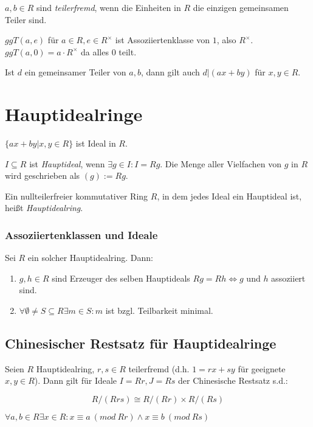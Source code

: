$a, b \in R$ sind \emph{teilerfremd}, wenn die Einheiten in $R$ die einzigen gemeinsamen Teiler sind.

\spacing

$ggT(a,e)$ für $a \in R, e \in R^\times$ ist Assoziiertenklasse von $1$, also $R^\times$. $ggT(a,0) = a\cdot R^\times$ da alles $0$ teilt.

Ist $d$ ein gemeinsamer Teiler von $a, b$, dann gilt auch $d |(ax+by)$ für $x,y \in R$.

\section*{Hauptidealringe}

$\{ax+by | x,y \in R\}$ ist Ideal in $R$.

$I \subseteq R$ ist \emph{Hauptideal}, wenn $\exists g \in I : I = Rg$. Die Menge aller Vielfachen von $g$ in $R$ wird geschrieben als $(g) := Rg$.

\spacing

Ein nullteilerfreier kommutativer Ring $R$, in dem jedes Ideal ein Hauptideal ist, heißt \emph{Hauptidealring}.

\subsubsection*{Assoziiertenklassen und Ideale}

Sei $R$ ein solcher Hauptidealring. Dann:

\begin{enumerate}[label=(\alph*)]
	\item $g, h \in R$ sind Erzeuger des selben Hauptideals $Rg = Rh \iff g$ und $h$ assoziiert sind.
	\item $\forall \emptyset \neq S \subseteq R \exists m \in S : m$ ist bzgl. Teilbarkeit minimal.
\end{enumerate}

\subsection*{Chinesischer Restsatz für Hauptidealringe}

Seien $R$ Hauptidealring, $r, s \in R$ teilerfremd (d.h. $1=rx+sy$ für geeignete $x, y \in R$). Dann gilt für Ideale $I = Rr, J = Rs$ der Chinesische Restsatz s.d.:

\vspace*{-2mm}
$$R/(Rrs) \cong R/(Rr) \times R/(Rs)$$

$\forall a, b \in R \exists x \in R : x \equiv a \ (mod \ Rr) \land x \equiv b \ (mod \ Rs)$

